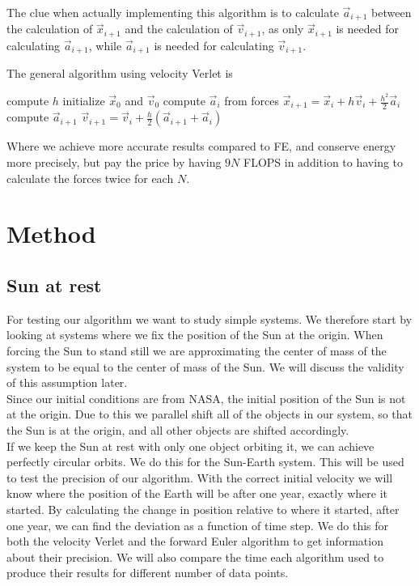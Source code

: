 \documentclass[%
 reprint,
nofootinbib,
aps,
]{revtex4-1}
\begin{document}
The clue when actually implementing this algorithm is to calculate $\vec{a}_{i+1}$ between the calculation of $\vec{x}_{i+1}$ and the calculation of $\vec{v}_{i+1}$, as only $\vec{x}_{i+1}$ is needed for calculating $\vec{a}_{i+1}$, while $\vec{a}_{i+1}$ is needed for calculating $\vec{v}_{i+1}$.

The general algorithm using velocity Verlet is

\begin{algorithmic}[H]
\State compute $h$
\State initialize $\vec{x}_0$ and $\vec{v}_0$
	\State compute $\vec{a}_i$ from forces
	\State $\vec{x}_{i+1} = \vec{x}_i + h\vec{v}_i + \frac{h^2}{2}\vec{a}_i$
	\State compute $\vec{a}_{i+1}$
	\State $\vec{v}_{i+1} = \vec{v}_i + \frac{h}{2}\left( \vec{a}_{i+1} + \vec{a}_i \right)$
\EndFor
\State
\end{algorithmic}
Where we achieve more accurate results compared to FE, and conserve energy more precisely, but pay the price by having $9N$ FLOPS in addition to having to calculate the forces twice for each $N$.

\section{Method}
\subsection{Sun at rest}
For testing our algorithm we want to study simple systems. We therefore start by looking at systems where we fix the position of the Sun at the origin. When forcing the Sun to stand still we are approximating the center of mass of the system to be equal to the center of mass of the Sun. We will discuss the validity of this assumption later.\\
Since our initial conditions are from NASA, the initial position of the Sun is not at the origin. Due to this we parallel shift all of the objects in our system, so that the Sun is at the origin, and all other objects are shifted accordingly.\\
If we keep the Sun at rest with only one object orbiting it, we can achieve perfectly circular orbits. We do this for the Sun-Earth system. This will be used to test the precision of our algorithm. With the correct initial velocity we will know where the position of the Earth will be after one year, exactly where it started. By calculating the change in position relative to where it started, after one year, we can find the deviation as a function of time step. We do this for both the velocity Verlet and the forward Euler algorithm to get information about their precision. We will also compare the time each algorithm used to produce their results for different number of data points.
\end{document}
